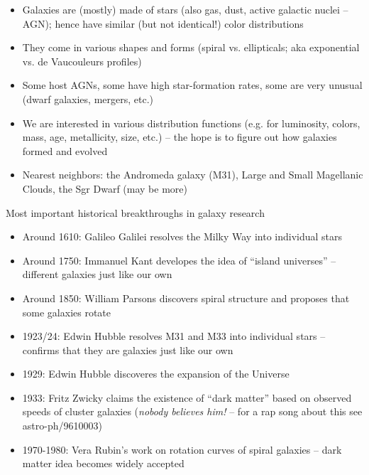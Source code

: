 \documentclass[letterpaper,landscape]{slides}
\begin{document}
\begin{slide}
{\begin{minipage}[t]{15cm}
\begin{itemize}
\item
Galaxies are (mostly) made of stars (also gas, dust, active galactic nuclei -- AGN); 
hence have similar (but not identical!) color distributions
\item
They come in various shapes and forms (spiral vs. ellipticals; aka exponential
vs. de Vaucouleurs profiles)
\item
Some host AGNs, some have high star-formation rates, some are very unusual
(dwarf galaxies, mergers, etc.)
\item
We are interested in various distribution functions (e.g. for 
luminosity, colors, mass, age, metallicity, size, etc.) -- the hope is to
figure out {\color{blue} how galaxies formed and evolved}
\item
Nearest neighbors: the Andromeda galaxy (M31), Large and Small Magellanic Clouds, 
the Sgr Dwarf (may be more)
\end{itemize}  

\end{minipage}}
\vfill 
\end{slide}


\begin{slide}
\begin{center}
{\large \color{red} 
                   Most important historical breakthroughs in galaxy research }
\end{center}

\begin{itemize}
\item Around 1610: Galileo Galilei resolves the Milky Way into individual stars 
\item Around 1750: Immanuel Kant developes the idea of ``island universes'' -- different
    galaxies just like our own
\item Around 1850: William Parsons discovers spiral structure and proposes that some galaxies
                 rotate
\item 1923/24: Edwin Hubble resolves M31 and M33 into individual stars -- confirms
   that they are galaxies just like our own
\item 1929: Edwin Hubble discoveres the expansion of the Universe
\item 1933: Fritz Zwicky claims the existence of ``dark matter'' based on observed speeds
     of cluster galaxies ({\it nobody believes him!} -- for a rap song about this see
     astro-ph/9610003)
\item 1970-1980: Vera Rubin's work on rotation curves of spiral galaxies -- dark matter idea
   becomes widely accepted
\end{itemize}     
     
\vfill
\end{slide}
\end{document}
